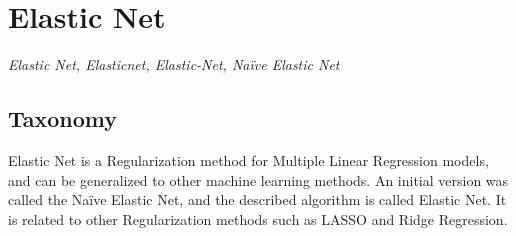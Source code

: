 
\section{Elastic Net} 
\label{sec:elasticnet}

\emph{Elastic Net, Elasticnet, Elastic-Net, Na\"ive Elastic Net}

\subsection{Taxonomy}
Elastic Net is a Regularization method for Multiple Linear Regression models, and can be generalized to other machine learning methods.
An initial version was called the  Na\"ive Elastic Net, and the described algorithm is called Elastic Net.
It is related to other Regularization methods such as LASSO and Ridge Regression.

